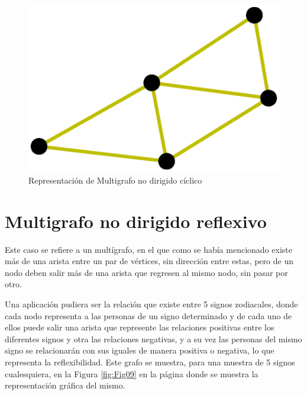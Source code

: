 \documentclass{article}
\begin{document}


\begin{figure}
    \centering
    \includegraphics[scale=0.6]{imagenes/Fig08.eps}
    \caption{Representación de Multigrafo no dirigido cíclico}
    \label{fig:Fig08}
\end{figure}

\section{Multigrafo no dirigido reflexivo}

Este caso se refiere a un multígrafo, en el que como se había mencionado existe más de una arista entre un par de vértices, sin dirección entre estas, pero de un nodo deben salir más de una arista que regresen al mismo nodo, sin pasar por otro.

Una aplicación pudiera ser la relación que existe entre 5 signos zodiacales, donde cada nodo representa a las personas de un signo determinado y de cada uno de ellos puede salir una arista que represente las relaciones positivas entre los diferentes signos y otra las relaciones negativas, y a su vez las personas del mismo signo se relacionarán con sus iguales de manera positiva o negativa, lo que representa la reflexibilidad. Este grafo se muestra, para una muestra de 5 signos cualesquiera, en la Figura \ref{fig:Fig09} en la página \pageref{fig:Fig09} donde se muestra la representación gráfica del mismo.



\end{document}
